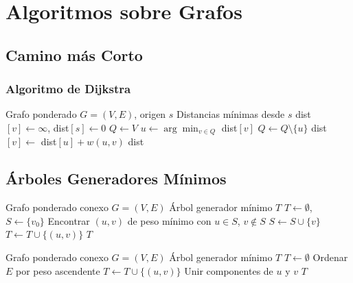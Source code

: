 \chapter{Algoritmos sobre Grafos}

\section{Camino más Corto}

\subsection{Algoritmo de Dijkstra}

\begin{algorithm}[htbp]
\caption{Algoritmo de Dijkstra}
\begin{algorithmic}[1]
\Require Grafo ponderado $G=(V,E)$, origen $s$
\Ensure Distancias mínimas desde $s$
\State dist$[v] \gets \infty$, dist$[s] \gets 0$
\State $Q \gets V$
  \State $u \gets \arg\min_{v \in Q}$ dist$[v]$
  \State $Q \gets Q \setminus \{u\}$
      \State dist$[v] \gets$ dist$[u] + w(u,v)$
    \EndIf
  \EndFor
\EndWhile
\State \Return dist
\end{algorithmic}
\end{algorithm}

\section{Árboles Generadores Mínimos}

\begin{algorithm}[htbp]
\caption{Algoritmo de Prim}
\begin{algorithmic}[1]
\Require Grafo ponderado conexo $G=(V,E)$
\Ensure Árbol generador mínimo $T$
\State $T \gets \emptyset$, $S \gets \{v_0\}$
  \State Encontrar $(u,v)$ de peso mínimo con $u \in S$, $v \notin S$
  \State $S \gets S \cup \{v\}$
  \State $T \gets T \cup \{(u,v)\}$
\EndWhile
\State \Return $T$
\end{algorithmic}
\end{algorithm}

\begin{algorithm}[htbp]
\caption{Algoritmo de Kruskal}
\begin{algorithmic}[1]
\Require Grafo ponderado conexo $G=(V,E)$
\Ensure Árbol generador mínimo $T$
\State $T \gets \emptyset$
\State Ordenar $E$ por peso ascendente
    \State $T \gets T \cup \{(u,v)\}$
    \State Unir componentes de $u$ y $v$
  \EndIf
\EndFor
\State \Return $T$
\end{algorithmic}
\end{algorithm}

